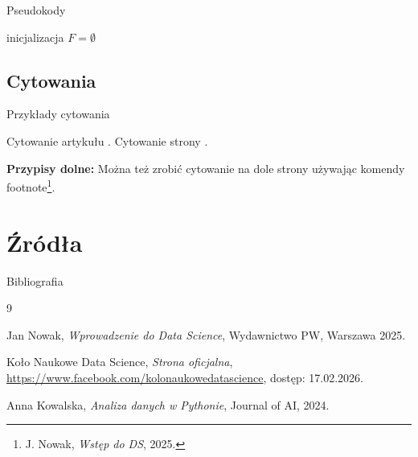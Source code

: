 \documentclass[polish]{beamer}
\begin{document}
\begin{frame}{Pseudokody}
    \small
    \begin{algorithm}[H]
        \SetAlgoLined
        inicjalizacja $F = \emptyset$\;
        \caption{Forward Selection}
    \end{algorithm}
\end{frame}

\subsection{Cytowania}
\begin{frame}{Przykłady cytowania}
  \lipsum[20]
  
  \vspace{1em}
  
  Cytowanie artykułu \cite{nowak2025}. 
  Cytowanie strony \cite{FacebookKNDS}.
  
  \vspace{1em}
  
  \textbf{Przypisy dolne:}
  Można też zrobić cytowanie na dole strony używając komendy footnote\footnote{J. Nowak, \textit{Wstęp do DS}, 2025.}.
\end{frame}

\section{Źródła}
\begin{frame}{Bibliografia}
  \begin{thebibliography}{9}
  
    Jan Nowak,
    \textit{Wprowadzenie do Data Science},
    Wydawnictwo PW, Warszawa 2025.

    Koło Naukowe Data Science,
    \textit{Strona oficjalna},
    \url{https://www.facebook.com/kolonaukowedatascience}, dostęp: 17.02.2026.
    
    Anna Kowalska,
    \textit{Analiza danych w Pythonie},
    Journal of AI, 2024.
  \end{thebibliography}
\end{frame}
\end{document}
